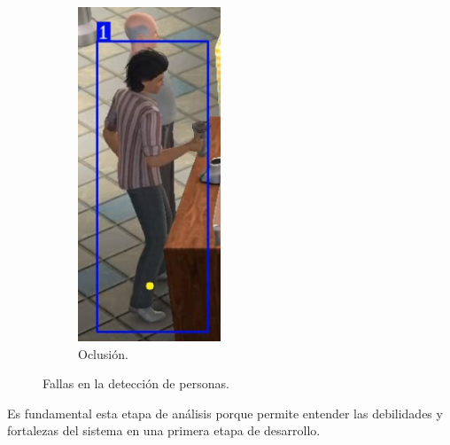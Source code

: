 \begin{figure}[!htpb]
\begin{subfigure}[b]{0.3\textwidth}
         \includegraphics[width=.65\textwidth]{./Figures/fallasDetector3.png}
         \caption{Oclusión.}
         \label{fig:fallasDetector3de3}
     \end{subfigure}
        \caption{Fallas en la detección de personas.}
        \label{fig:fallasDetector}
\end{figure}


Es fundamental esta etapa de análisis porque permite entender las debilidades y fortalezas del sistema en una primera etapa de desarrollo.

\newpage


